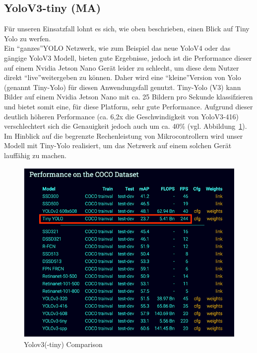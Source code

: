 \documentclass[a4paper,oneside,12pt]{report}
\begin{document}
\begin{onehalfspace}
		\subsection{YoloV3-tiny (MA)}
		Für unseren Einsatzfall lohnt es sich, wie oben beschrieben, einen Blick auf Tiny Yolo zu werfen. \\
		Ein "`ganzes"'\space YOLO Netzwerk, wie zum Beispiel das neue YoloV4 oder das gängige YoloV3 Modell, bieten gute Ergebnisse, jedoch ist die Performance dieser auf einem Nvidia Jetson Nano Gerät leider zu schlecht, um diese dem Nutzer direkt "`live"'\space weitergeben zu können.
		Daher wird eine "`kleine"'\space Version von Yolo (genannt Tiny-Yolo) für diesen Anwendungsfall genutzt. Tiny-Yolo (V3) kann Bilder auf einem Nvidia Jetson Nano mit ca. 25 Bildern pro Sekunde klassifzieren und bietet somit eine, für diese Platform, sehr gute Performance.\clearpage
		Aufgrund dieser deutlich höheren Performance (ca. 6,2x die Geschwindigkeit von YoloV3-416) verschlechtert sich die Genauigkeit jedoch auch um ca. 40\% (vgl. Abbildung~\ref{fig:yolov3-tiny}). \\
		Im Hinblick auf die begrenzte Rechenleistung von Mikrocontrollern wird unser Modell mit Tiny-Yolo realisiert, um das Netzwerk auf einem solchen Gerät lauffähig zu machen.
		\begin{figure}[h!]
			\includegraphics[scale=0.7]{YoloV3-tiny.png}
			\caption{Yolov3(-tiny) Comparison}
			\label{fig:yolov3-tiny}
		\end{figure}
	\end{onehalfspace}
\end{document}
